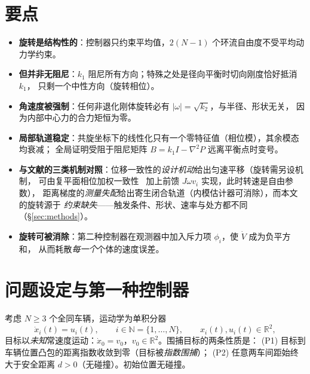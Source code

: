 \documentclass[11pt,a4paper]{ctexart}
\theoremstyle{plain}
\theoremstyle{definition}
\theoremstyle{remark}
\newcommand{\R}{\mathbb{R}}
\newcommand{\NN}{\mathbb{N}}
\begin{document}
\section*{要点}
\begin{itemize}[leftmargin=1.6em,itemsep=0.3em]
  \item \textbf{旋转是结构性的}：控制器只约束平均值，$2(N-1)$ 个环流自由度不受平均动力学约束。
  \item \textbf{但并非无阻尼}：$k_1$ 阻尼所有方向；特殊之处是径向平衡时切向刚度恰好抵消 $k_1$，
        只剩一个中性方向（旋转相位）。
  \item \textbf{角速度被强制}：任何非退化刚体旋转必有 $|\omega|=\sqrt{k_2}$，与半径、形状无关，
        因为内部中心力的合力矩恒为零。
  \item \textbf{局部轨道稳定}：共旋坐标下的线性化只有一个零特征值（相位模），其余模态均衰减；
        全局证明受阻于阻尼矩阵 $B=k_1I-\nabla^2P$ 远离平衡点时变号。
  \item \textbf{与文献的三类机制对照}：位移一致性的\emph{设计机动}给出匀速平移（旋转需另设机制，
        可由复平面相位加权一致性~\cite{lin2010} 加上前馈 $J\omega v_i$ 实现，此时转速是自由参数），
        距离梯度的\emph{测量失配}给出寄生闭合轨道（内模估计器可消除），而本文的旋转源于
        \emph{约束缺失}——触发条件、形状、速率与处方都不同（\S\ref{sec:methods}）。
  \item \textbf{旋转可被消除}：第二种控制器在观测器中加入斥力项 $\phi_i$，使 $\dot V$ 成为负平方和，
        从而耗散\emph{每一个}个体的速度误差。
\end{itemize}

\section{问题设定与第一种控制器}
\label{sec:model}

考虑 $N\ge 3$ 个全同车辆，运动学为单积分器
\begin{equation}
  \dot x_i(t)=u_i(t),\qquad i\in\NN=\{1,\dots,N\},\qquad x_i(t),u_i(t)\in\R^2,
  \label{eq:veh}
\end{equation}
目标以\emph{未知}常速度运动：$\dot x_0=v_0$，$v_0\in\R^2$。围捕目标的两条性质是：
(P1) 目标到车辆位置凸包的距离指数收敛到零（目标被\emph{指数围捕}）；
(P2) 任意两车间距始终大于安全距离 $d>0$（无碰撞）。初始位置无碰撞。
\end{document}
